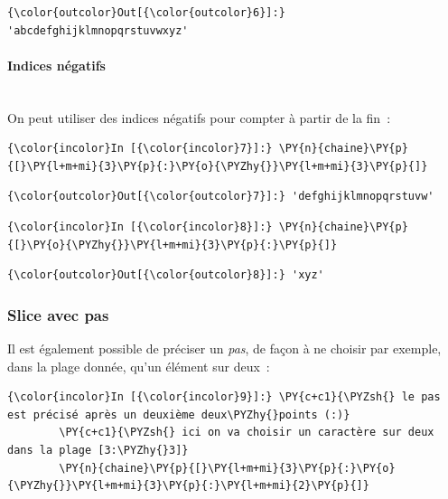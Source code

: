\begin{Verbatim}[commandchars=\\\{\}]
{\color{outcolor}Out[{\color{outcolor}6}]:} 'abcdefghijklmnopqrstuvwxyz'
\end{Verbatim}
            
    \hypertarget{indices-nuxe9gatifs}{%
\paragraph{Indices négatifs\\\\}\label{indices-nuxe9gatifs}}

    On peut utiliser des indices négatifs pour compter à partir de la fin~:

    \begin{Verbatim}[commandchars=\\\{\}]
{\color{incolor}In [{\color{incolor}7}]:} \PY{n}{chaine}\PY{p}{[}\PY{l+m+mi}{3}\PY{p}{:}\PY{o}{\PYZhy{}}\PY{l+m+mi}{3}\PY{p}{]}
\end{Verbatim}


\begin{Verbatim}[commandchars=\\\{\}]
{\color{outcolor}Out[{\color{outcolor}7}]:} 'defghijklmnopqrstuvw'
\end{Verbatim}
            
    \begin{Verbatim}[commandchars=\\\{\}]
{\color{incolor}In [{\color{incolor}8}]:} \PY{n}{chaine}\PY{p}{[}\PY{o}{\PYZhy{}}\PY{l+m+mi}{3}\PY{p}{:}\PY{p}{]}
\end{Verbatim}


\begin{Verbatim}[commandchars=\\\{\}]
{\color{outcolor}Out[{\color{outcolor}8}]:} 'xyz'
\end{Verbatim}
            
    \hypertarget{slice-avec-pas}{%
\subsubsection{Slice avec pas}\label{slice-avec-pas}}

    Il est également possible de préciser un \emph{pas}, de façon à ne
choisir par exemple, dans la plage donnée, qu'un élément sur deux~:

    \begin{Verbatim}[commandchars=\\\{\}]
{\color{incolor}In [{\color{incolor}9}]:} \PY{c+c1}{\PYZsh{} le pas est précisé après un deuxième deux\PYZhy{}points (:)}
        \PY{c+c1}{\PYZsh{} ici on va choisir un caractère sur deux dans la plage [3:\PYZhy{}3]}
        \PY{n}{chaine}\PY{p}{[}\PY{l+m+mi}{3}\PY{p}{:}\PY{o}{\PYZhy{}}\PY{l+m+mi}{3}\PY{p}{:}\PY{l+m+mi}{2}\PY{p}{]}
\end{Verbatim}


